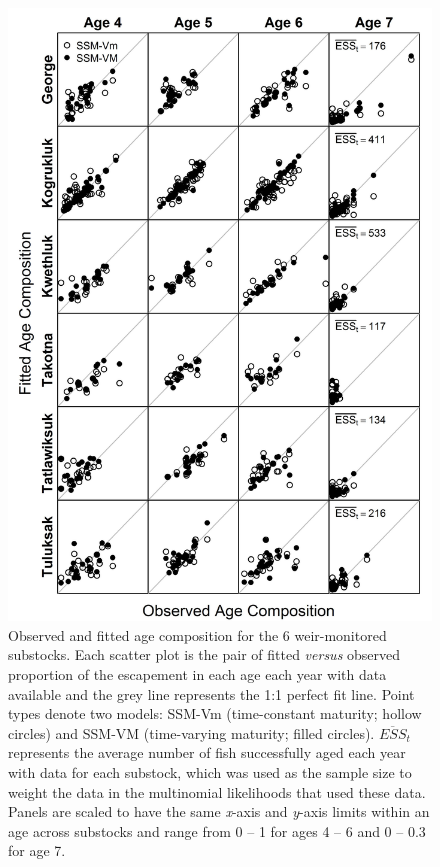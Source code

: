 \documentclass[12pt,]{book}
\theoremstyle{definition}
\theoremstyle{definition}
\theoremstyle{definition}
\theoremstyle{remark}
\begin{document}
\clearpage

\begin{figure}
  \centering
  \includegraphics{img/Ch4/age-fit.jpg}
  \caption{Observed and fitted age composition for the 6 weir-monitored substocks. Each scatter plot is the pair of fitted \textit{versus} observed proportion of the escapement in each age each year with data available and the grey line represents the 1:1 perfect fit line. Point types denote two models: SSM-Vm (time-constant maturity; hollow circles) and SSM-VM (time-varying maturity; filled circles). $\overline{ESS}_t$ represents the average number of fish successfully aged each year with data for each substock, which was used as the sample size to weight the data in the multinomial likelihoods that used these data. Panels are scaled to have the same \textit{x}-axis and \textit{y}-axis limits within an age across substocks and range from 0 -- 1 for ages 4 -- 6 and 0 -- 0.3 for age 7.}
  \label{fig:age-fit}
\end{figure}
\end{document}
